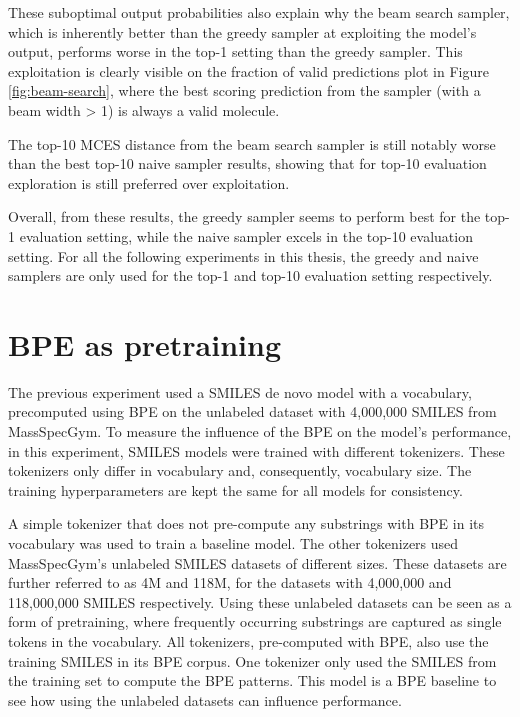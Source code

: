 These suboptimal output probabilities also explain why the beam search sampler, which is inherently better than the greedy sampler at exploiting the model's output, performs worse in the top-1 setting than the greedy sampler.
This exploitation is clearly visible on the fraction of valid predictions plot in Figure \ref{fig:beam-search}, where the best scoring prediction from the sampler (with a beam width > 1) is always a valid molecule.

The top-10 MCES distance from the beam search sampler is still notably worse than the best top-10 naive sampler results, showing that for top-10 evaluation exploration is still preferred over exploitation.

Overall, from these results, the greedy sampler seems to perform best for the top-1 evaluation setting, while the naive sampler excels in the top-10 evaluation setting.
For all the following experiments in this thesis, the greedy and naive samplers are only used for the top-1 and top-10 evaluation setting respectively.

\section{\ac{BPE} as pretraining}

The previous experiment used a SMILES de novo model with a vocabulary, precomputed using \ac{BPE} on the unlabeled dataset with 4,000,000 SMILES from MassSpecGym.
To measure the influence of the \acf{BPE} on the model's performance, in this experiment, SMILES models were trained with different tokenizers.
These tokenizers only differ in vocabulary and, consequently, vocabulary size.
The training hyperparameters are kept the same for all models for consistency.

A simple tokenizer that does not pre-compute any substrings with \ac{BPE} in its vocabulary was used to train a baseline model.
The other tokenizers used MassSpecGym's unlabeled SMILES datasets of different sizes.
These datasets are further referred to as 4M and 118M, for the datasets with 4,000,000 and 118,000,000 SMILES respectively.
Using these unlabeled datasets can be seen as a form of pretraining, where frequently occurring substrings are captured as single tokens in the vocabulary.
All tokenizers, pre-computed with \ac{BPE}, also use the training SMILES in its \ac{BPE} corpus.
One tokenizer only used the SMILES from the training set to compute the \ac{BPE} patterns.
This model is a \ac{BPE} baseline to see how using the unlabeled datasets can influence performance.

